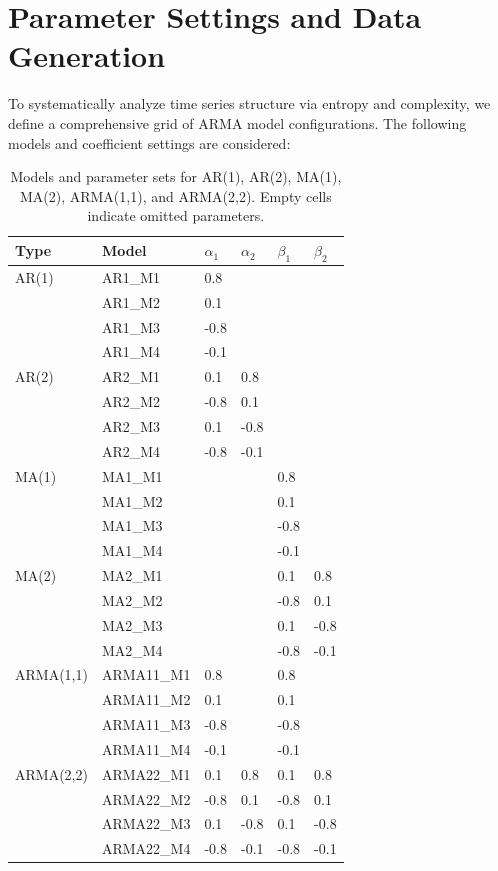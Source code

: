 \documentclass[12pt,a4paper]{article}
\begin{document}
\section{Parameter Settings and Data Generation}

To systematically analyze time series structure via entropy and complexity, we define a comprehensive grid of ARMA model configurations. The following models and coefficient settings are considered:

\begin{table}[h!]
	\centering
	\begin{tabular}{llllll}
		\toprule
		\textbf{Type} & \textbf{Model} & $\alpha_1$ & $\alpha_2$ & $\beta_1$ & $\beta_2$ \\
		\midrule
		AR(1)      & AR1\_M1  & 0.8   &      &      &      \\
		& AR1\_M2  & 0.1   &      &      &      \\
		& AR1\_M3  & -0.8  &      &      &      \\
		& AR1\_M4  & -0.1  &      &      &      \\
		AR(2)      & AR2\_M1  & 0.1   & 0.8  &      &      \\
		& AR2\_M2  & -0.8  & 0.1  &      &      \\
		& AR2\_M3  & 0.1   & -0.8 &      &      \\
		& AR2\_M4  & -0.8  & -0.1 &      &      \\
		MA(1)      & MA1\_M1  &       &      & 0.8  &      \\
		& MA1\_M2  &       &      & 0.1  &      \\
		& MA1\_M3  &       &      & -0.8 &      \\
		& MA1\_M4  &       &      & -0.1 &      \\
		MA(2)      & MA2\_M1  &       &      & 0.1  & 0.8  \\
		& MA2\_M2  &       &      & -0.8 & 0.1  \\
		& MA2\_M3  &       &      & 0.1  & -0.8 \\
		& MA2\_M4  &       &      & -0.8 & -0.1 \\
		ARMA(1,1)  & ARMA11\_M1 & 0.8 &      & 0.8  &      \\
		& ARMA11\_M2 & 0.1 &      & 0.1  &      \\
		& ARMA11\_M3 & -0.8 &     & -0.8 &      \\
		& ARMA11\_M4 & -0.1 &     & -0.1 &      \\
		ARMA(2,2)  & ARMA22\_M1 & 0.1 & 0.8  & 0.1  & 0.8  \\
		& ARMA22\_M2 & -0.8 & 0.1 & -0.8 & 0.1  \\
		& ARMA22\_M3 & 0.1 & -0.8 & 0.1  & -0.8 \\
		& ARMA22\_M4 & -0.8 & -0.1 & -0.8 & -0.1 \\
		\bottomrule
	\end{tabular}
	\caption{Models and parameter sets for AR(1), AR(2), MA(1), MA(2), ARMA(1,1), and ARMA(2,2). Empty cells indicate omitted parameters.}
\end{table}
\end{document}
